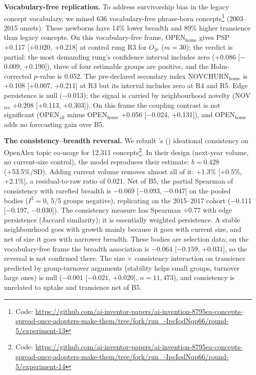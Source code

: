 \documentclass[11pt,letterpaper]{article}
\begin{document}
\textbf{Vocabulary-free replication.} To address survivorship bias in the legacy concept vocabulary, we mined 636 vocabulary-free phrase-born concepts\footnote{Code: \url{https://github.com/ai-inventor-papers/ai-invention-8795ea-concepts-spread-once-adopters-make-them/tree/fork/run_-IpcIodNqp66/round-5/experiment-13}} (2003--2015 onsets). These newborns have 14\% lower breadth and 89\% higher transience than legacy concepts. On this vocabulary-free frame, OPEN$_{\text{home}}$ gives PSP +0.117 [+0.020, +0.218] at control rung R3 for $O_{2r}$ ($m = 30$); the verdict is partial: the most demanding rung's confidence interval includes zero (+0.086 [$-$0.009, +0.190]), three of four estimable groups are positive, and the Holm-corrected $p$-value is 0.052. The pre-declared secondary index NOVCHURN$_{\text{home}}$ is +0.108 [+0.007, +0.211] at R3 but its interval includes zero at R4 and R5. Edge persistence is null ($-$0.013); the signal is carried by neighbourhood novelty (NOV$_{\text{res}}$ +0.208 [+0.113, +0.303]). On this frame the coupling contrast is not significant (OPEN$_{\text{all}}$ minus OPEN$_{\text{home}}$ +0.056 [$-$0.024, +0.131]), and OPEN$_{\text{home}}$ adds no forecasting gain over B5.

\textbf{The consistency--breadth reversal.} We rebuilt \citeauthor{Cheng2023}'s (\citeyear{Cheng2023}) ideational consistency on OpenAlex topic co-usage for 12{,}311 concepts\footnote{Code: \url{https://github.com/ai-inventor-papers/ai-invention-8795ea-concepts-spread-once-adopters-make-them/tree/fork/run_-IpcIodNqp66/round-5/experiment-14}}. In their design (next-year volume, no current-size control), the model reproduces their estimate: $b = 0.428$ (+53.5\%/SD). Adding current volume removes almost all of it: +1.3\% [+0.5\%, +2.1\%], a residual-to-raw ratio of 0.021. Net of B5, the partial Spearman of consistency with rarefied breadth is $-$0.069 [$-$0.093, $-$0.047] on the pooled bodies ($I^2 = 0$, 5/5 groups negative), replicating on the 2015--2017 cohort ($-$0.111 [$-$0.197, $-$0.030]). The consistency measure has Spearman +0.77 with edge persistence (Jaccard similarity); it is essentially weighted persistence. A stable neighbourhood goes with growth mainly because it goes with current size, and net of size it goes with narrower breadth. These bodies are selection data; on the vocabulary-free frame the breadth association is $-0.064$ [$-0.159$, $+0.031$], so the reversal is not confirmed there. The size $\times$ consistency interaction on transience predicted by group-turnover arguments (stability helps small groups, turnover large ones) is null ($-0.001$ [$-0.021$, $+0.020$], $n = 11{,}473$), and consistency is unrelated to uptake and transience net of B5.
\end{document}
